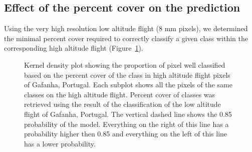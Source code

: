 \documentclass[
  number]{elsarticle}
\begin{document}
\subsection{Effect of the percent cover on the
prediction}\label{effect-of-the-percent-cover-on-the-prediction}

Using the very high resolution low altitude flight (8 mm pixels), we
determined the minimal percent cover required to correctly classify a
given class within the corresponding high altitude flight
(Figure~\ref{fig-upscaling}).

\label{cell-fig-upscaling}
\begin{figure}[H]


\caption{\label{fig-upscaling}Kernel density plot showing the proportion
of pixel well classified based on the percent cover of the class in high
altitude flight pixels of Gafanha, Portugal. Each subplot shows all the
pixels of the same classes on the high altitude flight. Percent cover of
classes was retrieved using the result of the classification of the low
altitude flight of Gafanha, Portugal. The vertical dashed line shows the
0.85 probability of the model. Everything on the right of this line has
a probability higher then 0.85 and everything on the left of this line
has a lower probability.}

\end{figure}%
\end{document}
